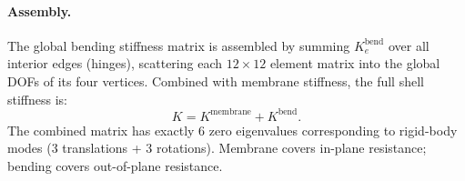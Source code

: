 \paragraph{Assembly.}
The global bending stiffness matrix is assembled by summing $K_e^{\text{bend}}$ over all interior edges (hinges), scattering each $12 \times 12$ element matrix into the global DOFs of its four vertices. Combined with membrane stiffness, the full shell stiffness is:
\begin{equation}
  K = K^{\text{membrane}} + K^{\text{bend}}.
\end{equation}
The combined matrix has exactly 6 zero eigenvalues corresponding to rigid-body modes (3 translations + 3 rotations). Membrane covers in-plane resistance; bending covers out-of-plane resistance.
